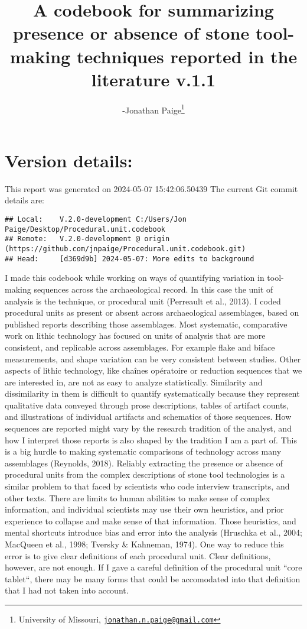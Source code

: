 \documentclass[
]{article}
\title{A codebook for summarizing presence or absence of stone
tool-making techniques reported in the literature v.1.1}
\author{-Jonathan Paige\footnote{University of Missouri,
  \href{mailto:jonathan.n.paige@gmail.com}{\nolinkurl{jonathan.n.paige@gmail.com}}}}
\date{}
\begin{document}
\maketitle

{
\setcounter{tocdepth}{3}
\tableofcontents
}
\hypertarget{version-details}{%
\section{Version details:}\label{version-details}}

This report was generated on 2024-05-07 15:42:06.50439 The current Git
commit details are:

\begin{verbatim}
## Local:    V.2.0-development C:/Users/Jon Paige/Desktop/Procedural.unit.codebook
## Remote:   V.2.0-development @ origin (https://github.com/jnpaige/Procedural.unit.codebook.git)
## Head:     [d369d9b] 2024-05-07: More edits to background
\end{verbatim}

I made this codebook while working on ways of quantifying variation in
tool-making sequences across the archaeological record. In this case the
unit of analysis is the technique, or procedural unit (Perreault et al.,
2013). I coded procedural units as present or absent across
archaeological assemblages, based on published reports describing those
assemblages. Most systematic, comparative work on lithic technology has
focused on units of analysis that are more consistent, and replicable
across assemblages. For example flake and biface measurements, and shape
variation can be very consistent between studies. Other aspects of
lithic technology, like chaînes opératoire or reduction sequences that
we are interested in, are not as easy to analyze statistically.
Similarity and dissimilarity in them is difficult to quantify
systematically because they represent qualitative data conveyed through
prose descriptions, tables of artifact counts, and illustrations of
individual artifacts and schematics of those sequences. How sequences
are reported might vary by the research tradition of the analyst, and
how I interpret those reports is also shaped by the tradition I am a
part of. This is a big hurdle to making systematic comparisons of
technology across many assemblages (Reynolds, 2018). Reliably extracting
the presence or absence of procedural units from the complex
descriptions of stone tool technologies is a similar problem to that
faced by scientists who code interview transcripts, and other texts.
There are limits to human abilities to make sense of complex
information, and individual scientists may use their own heuristics, and
prior experience to collapse and make sense of that information. Those
heuristics, and mental shortcuts introduce bias and error into the
analysis (Hruschka et al., 2004; MacQueen et al., 1998; Tversky \&
Kahneman, 1974). One way to reduce this error is to give clear
definitions of each procedural unit. Clear definitions, however, are not
enough. If I gave a careful definition of the procedural unit ``core
tablet``, there may be many forms that could be accomodated into that
definition that I had not taken into account.
\end{document}
